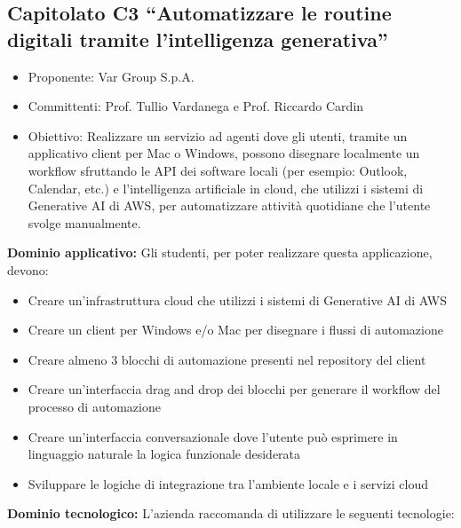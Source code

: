 \documentclass[10pt]{article}
\begin{document}
\subsection{Capitolato C3 “Automatizzare le routine digitali tramite l’intelligenza generativa”}
\begin{itemize}
    \item Proponente: Var Group S.p.A.
    \item Committenti: Prof. Tullio Vardanega e Prof. Riccardo Cardin
    \item Obiettivo: Realizzare un servizio ad agenti dove gli utenti, tramite un applicativo client per Mac o Windows, possono disegnare localmente un workflow sfruttando le API dei software locali (per esempio: Outlook, Calendar, etc.) e l’intelligenza artificiale in cloud, che utilizzi i sistemi di Generative AI di AWS, per automatizzare attività quotidiane che l’utente svolge manualmente.
\end{itemize}
\textbf{Dominio applicativo:}
Gli studenti, per poter realizzare questa applicazione, devono:
\begin{itemize}
    \item Creare un'infrastruttura cloud che utilizzi i sistemi di Generative AI di AWS
    \item Creare un client per Windows e/o Mac per disegnare i flussi di automazione
    \item Creare almeno 3 blocchi di automazione presenti nel repository del client
    \item Creare un'interfaccia drag and drop dei blocchi per generare il workflow del processo di automazione
    \item Creare un'interfaccia conversazionale dove l'utente può esprimere in linguaggio naturale la logica funzionale desiderata
    \item Sviluppare le logiche di integrazione tra l’ambiente locale e i servizi cloud
\end{itemize}
\textbf{Dominio tecnologico:}
L’azienda raccomanda di utilizzare le seguenti tecnologie:
\end{document}
